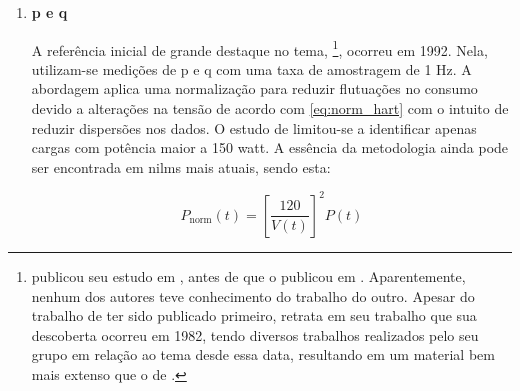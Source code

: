 \begin{enumerate}[label=\textbf{1.\arabic*},wide=\parindent]
\item \textbf{\Acrlong{p} e \Acrlong{q}}
\label{nilm:pot_real_reat}

\indent A referência inicial de grande destaque no tema,
\citet*{nilm_hart_1992_8}\footnote{\citet*{nilm_sultanem_1991_10}
publicou seu estudo em \citeyear{nilm_sultanem_1991_10}, antes de 
\citeauthor*{nilm_hart_1992_8} que o publicou em
\citeyear{nilm_hart_1992_8}. Aparentemente, nenhum dos autores teve
conhecimento do trabalho do outro. Apesar do trabalho de
\citeauthor*{nilm_sultanem_1991_10} ter sido publicado primeiro,
\citeauthor*{nilm_hart_1992_8} retrata em seu trabalho que sua descoberta
ocorreu em 1982, tendo diversos trabalhos realizados pelo seu grupo em
relação ao tema desde essa data, resultando em um material bem mais
extenso que o de \citeauthor*{nilm_sultanem_1991_10}.}, ocorreu em
1992. Nela, utilizam-se medições de
\gls{p} e \gls{q} com uma taxa de amostragem de 1 Hz. A abordagem
aplica uma normalização para reduzir flutuações no consumo devido a
alterações na tensão de acordo com \ref{eq:norm_hart} com o intuito de
reduzir dispersões nos dados. O estudo de \citeauthor*{nilm_hart_1992_8}
limitou-se a identificar apenas cargas com potência maior a 150
\acs{watt}. A essência da metodologia ainda pode ser encontrada
em \glspl{nilm} mais atuais, sendo esta: 

\begin{equation} \label{eq:norm_hart}
P_{\text{norm}}(t) = \left[ \frac{120}{V(t)} \right]^2 P(t)
\end{equation}


\end{enumerate}
